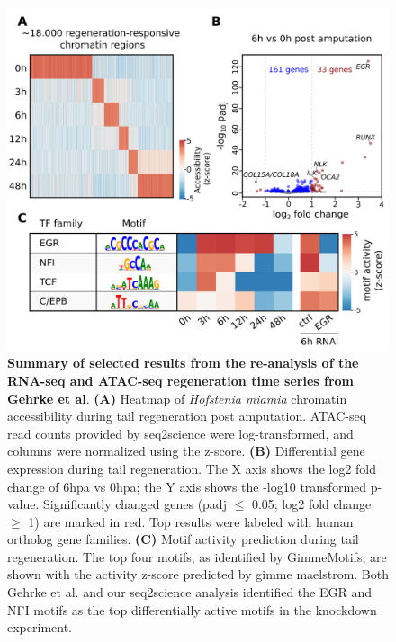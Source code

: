\begin{figure}
	\centering
	\includegraphics[width=\textwidth]{ch.seq2science/imgs/figure_acoel.png}
	\caption{\label{fig:aah} \textbf{Summary of selected results from the re-analysis of the RNA-seq and ATAC-seq regeneration time series from Gehrke et al}. \textbf{(A)} Heatmap of \textit{Hofstenia miamia} chromatin accessibility during tail regeneration post amputation. ATAC-seq read counts provided by seq2science were log-transformed, and columns were normalized using the z-score. \textbf{(B)} Differential gene expression during tail regeneration. The X axis shows the log2 fold change of 6hpa vs 0hpa; the Y axis shows the -log10 transformed p-value. Significantly changed genes (padj $\leq$ 0.05; log2 fold change $\geq$ 1) are marked in red. Top results were labeled with human ortholog gene families. \textbf{(C)} Motif activity prediction during tail regeneration. The top four motifs, as identified by GimmeMotifs, are shown with the activity z-score predicted by gimme maelstrom. Both Gehrke et al. and our seq2science analysis identified the EGR and NFI motifs as the top differentially active motifs in the knockdown experiment.}
\end{figure}

